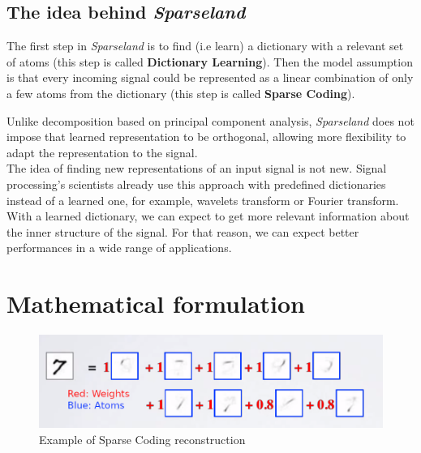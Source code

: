 \subsection*{The idea behind \textit{Sparseland}}
The first step in \textit{Sparseland} is to find (i.e learn) a dictionary with a relevant set of atoms (this step is called \textbf{Dictionary Learning}). Then the model assumption is that every incoming signal could be represented as a linear combination of only a few atoms from the dictionary (this step is called \textbf{Sparse Coding}).\\ \vspace{-0.4cm}
\begin{center}
\end{center}\vspace{0.4cm}
Unlike decomposition based on principal component analysis, \textit{Sparseland} does not impose that learned representation to be orthogonal, allowing more flexibility to adapt the representation to the signal.
\\
The idea of finding new representations of an input signal is not new. Signal processing's scientists already use this approach with predefined dictionaries instead of a learned one, for example, wavelets transform or Fourier transform. With a learned dictionary, we can expect to get more relevant information about the inner structure of the signal. For that reason, we can expect better performances in a wide range of applications.

\section{Mathematical formulation}


 \begin{figure}[h]
 \centering
 \includegraphics[scale=0.5]{spacecoding_12.png}
 \caption{Example of Sparse Coding reconstruction}
 \label{fig:exemple}
\end{figure}

